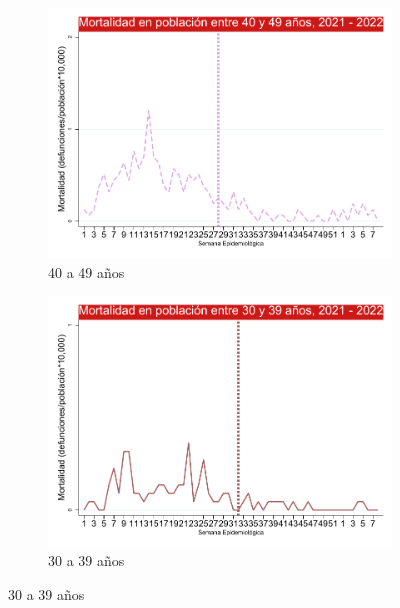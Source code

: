\documentclass[12pt,a4paper,openany]{book}
\begin{document}
\begin{figure}[h]
	\vspace{10mm}
	\begin{subfigure}[b]{0.45\textwidth}
		\centering
		\includegraphics[width=\textwidth]{../figuras/mortalidad_edad_40.pdf}
		\caption{40 a 49 años}
	\end{subfigure}
	\hfill
	\begin{subfigure}[b]{0.45\textwidth}
		\centering
		\includegraphics[width=\textwidth]{../figuras/mortalidad_edad_30.pdf}
		\caption{30 a 39 años}
	\end{subfigure}
\end{figure}
\end{document}
